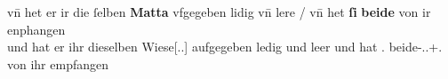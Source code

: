 \begin{exe}
\ex \label{ex:pronindir}
	\begin{xlist}
	\ex \label{ex:pronindir_1}
		\gll vn̄ het er ir {die ſelben} \textbf{Matta} vfgegeben lidig vn̄ lere /
			vn̄ het \textbf{ſi} \textbf{beide} von ir enphangen \\
			und hat er ihr dieselben Wiese[\Acc.\Pl.\FemI] aufgegeben ledig und
			leer {} und hat \Tpl\subI.\Acc{} beide-\Acc.\Pl.\M+\F\subI.\St{} von
			ihr empfangen \\
		\begin{taggedline}{\parencites(Freiburg i.\,Br., 1297)[\pno~2733, 105.23--24]{cao4}}
		\trans {}
		\end{taggedline}


\end{xlist}
\end{exe}
